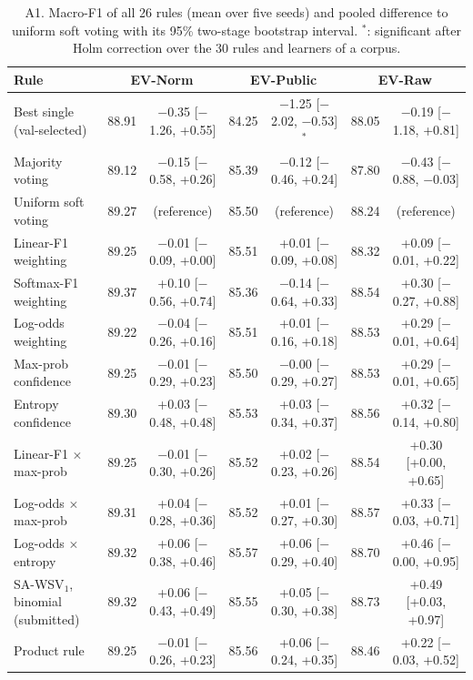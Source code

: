 \begin{table}[!htbp]\centering\scriptsize\setlength{\tabcolsep}{2.5pt}
\caption*{A1. Macro-F1 of all 26 rules (mean over five seeds) and pooled difference to uniform soft voting with its 95\% two-stage bootstrap interval. $^{*}$: significant after Holm correction over the 30 rules and learners of a corpus.}
\begin{tabular}{lcccccc}\toprule
Rule & \multicolumn{2}{c}{EV-Norm} & \multicolumn{2}{c}{EV-Public} & \multicolumn{2}{c}{EV-Raw} \\ \midrule
Best single (val-selected) & 88.91 & $-$0.35 [$-$1.26, +0.55] & 84.25 & $-$1.25 [$-$2.02, $-$0.53]$^{*}$ & 88.05 & $-$0.19 [$-$1.18, +0.81] \\
Majority voting & 89.12 & $-$0.15 [$-$0.58, +0.26] & 85.39 & $-$0.12 [$-$0.46, +0.24] & 87.80 & $-$0.43 [$-$0.88, $-$0.03] \\
Uniform soft voting & 89.27 & (reference) & 85.50 & (reference) & 88.24 & (reference) \\
Linear-F1 weighting & 89.25 & $-$0.01 [$-$0.09, +0.00] & 85.51 & +0.01 [$-$0.09, +0.08] & 88.32 & +0.09 [$-$0.01, +0.22] \\
Softmax-F1 weighting & 89.37 & +0.10 [$-$0.56, +0.74] & 85.36 & $-$0.14 [$-$0.64, +0.33] & 88.54 & +0.30 [$-$0.27, +0.88] \\
Log-odds weighting & 89.22 & $-$0.04 [$-$0.26, +0.16] & 85.51 & +0.01 [$-$0.16, +0.18] & 88.53 & +0.29 [$-$0.01, +0.64] \\
Max-prob confidence & 89.25 & $-$0.01 [$-$0.29, +0.23] & 85.50 & $-$0.00 [$-$0.29, +0.27] & 88.53 & +0.29 [$-$0.01, +0.65] \\
Entropy confidence & 89.30 & +0.03 [$-$0.48, +0.48] & 85.53 & +0.03 [$-$0.34, +0.37] & 88.56 & +0.32 [$-$0.14, +0.80] \\
Linear-F1 $\times$ max-prob & 89.25 & $-$0.01 [$-$0.30, +0.26] & 85.52 & +0.02 [$-$0.23, +0.26] & 88.54 & +0.30 [+0.00, +0.65] \\
Log-odds $\times$ max-prob & 89.31 & +0.04 [$-$0.28, +0.36] & 85.52 & +0.01 [$-$0.27, +0.30] & 88.57 & +0.33 [$-$0.03, +0.71] \\
Log-odds $\times$ entropy & 89.32 & +0.06 [$-$0.38, +0.46] & 85.57 & +0.06 [$-$0.29, +0.40] & 88.70 & +0.46 [$-$0.00, +0.95] \\
SA-WSV$_1$, binomial (submitted) & 89.32 & +0.06 [$-$0.43, +0.49] & 85.55 & +0.05 [$-$0.30, +0.38] & 88.73 & +0.49 [+0.03, +0.97] \\
Product rule & 89.25 & $-$0.01 [$-$0.26, +0.23] & 85.56 & +0.06 [$-$0.24, +0.35] & 88.46 & +0.22 [$-$0.03, +0.52] \\

\end{tabular}
\end{table}
